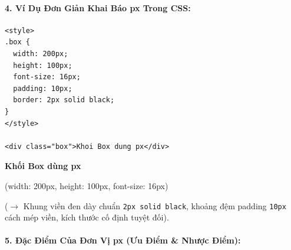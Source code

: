\documentclass[11pt,oneside]{book}
\newcommand{\codeinline}[1]{\textcolor{accentOrange}{\texttt{#1}}}
\begin{document}
\paragraph{4. Ví Dụ Đơn Giản Khai Báo px Trong CSS:}

\begin{codeWindow}
\begin{lstlisting}[language=HTML5]
<style>
.box {
  width: 200px;
  height: 100px;
  font-size: 16px;
  padding: 10px;
  border: 2px solid black;
}
</style>

<div class="box">Khoi Box dung px</div>
\end{lstlisting}
\end{codeWindow}

\begin{browserWindow}
\sffamily\small
\centering
\begin{tcolorbox}[
    enhanced,
    colback=gray!5,
    colframe=darkText,
    width=6.5cm,
    height=3.4cm,
    arc=0pt,
    boxrule=2pt,
    top=10pt, bottom=10pt, left=10pt, right=10pt
]
  \begin{tcolorbox}[
      enhanced,
      colback=white,
      colframe=primaryBlue!30,
      arc=3pt,
      boxrule=0.6pt,
      top=6pt, bottom=6pt, left=8pt, right=8pt
  ]
    \centering
    {\fontsize{14pt}{17pt}\selectfont\bfseries\color{primaryBlue} Khối Box dùng px}\par
    \vspace{2pt}
    \textcolor{codeComment}{\scriptsize (width: 200px, height: 100px, font-size: 16px)}
  \end{tcolorbox}
\end{tcolorbox}
\par\vspace{4pt}
\textcolor{primaryBlue}{\scriptsize ($\rightarrow$ Khung viền đen dày chuẩn \codeinline{2px solid black}, khoảng đệm padding \codeinline{10px} cách mép viền, kích thước cố định tuyệt đối).}
\end{browserWindow}

\paragraph{5. Đặc Điểm Của Đơn Vị px (Ưu Điểm \& Nhược Điểm):}
\end{document}
